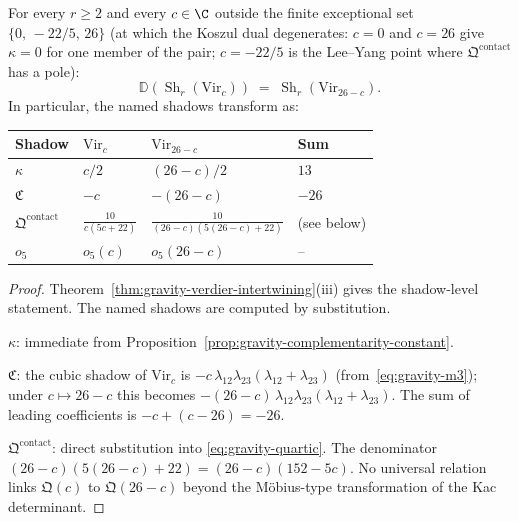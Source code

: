 \begin{theorem}
\label{thm:gravity-shadow-duality}
For every $r \ge 2$ and every $c \in \C$ outside the
finite exceptional set $\{0,\, -22/5,\, 26\}$
\textup{(}at which the Koszul dual degenerates: $c = 0$ and
$c = 26$ give $\kappa = 0$ for one member of the pair;
$c = -22/5$ is the Lee--Yang point where
$\mathfrak{Q}^{\mathrm{contact}}$ has a pole\textup{)}:
\begin{equation}\label{eq:shadow-duality}
\mathbb{D}\!\left(\operatorname{Sh}_r(\mathrm{Vir}_c)\right)
\;=\;
\operatorname{Sh}_r(\mathrm{Vir}_{26-c}).
\end{equation}
In particular, the named shadows transform as:
\begin{center}
\small
\renewcommand{\arraystretch}{1.15}
\begin{tabular}{llll}
\textbf{Shadow} & $\mathrm{Vir}_c$ & $\mathrm{Vir}_{26-c}$
 & \textbf{Sum} \\
\hline
$\kappa$ & $c/2$ & $(26-c)/2$ & $13$ \\[2pt]
$\mathfrak{C}$ & $-c$ & $-(26-c)$ & $-26$ \\[2pt]
$\mathfrak{Q}^{\mathrm{contact}}$
 & $\frac{10}{c(5c+22)}$
 & $\frac{10}{(26-c)(5(26-c)+22)}$
 & \textup{(see below)} \\[2pt]
$o_5$ & $o_5(c)$ & $o_5(26-c)$ & --
\end{tabular}
\end{center}
\end{theorem}

\begin{proof}
Theorem~\ref{thm:gravity-verdier-intertwining}(iii) gives the
shadow-level statement. The named shadows are computed by
substitution.

$\kappa$: immediate from
Proposition~\ref{prop:gravity-complementarity-constant}.

$\mathfrak{C}$: the cubic shadow of $\mathrm{Vir}_c$ is
$-c\,\lambda_{12}\lambda_{23}(\lambda_{12}+\lambda_{23})$
(from~\eqref{eq:gravity-m3}); under $c \mapsto 26-c$ this
becomes $-(26-c)\,\lambda_{12}\lambda_{23}(\lambda_{12}+\lambda_{23})$.
The sum of leading coefficients is $-c + (c-26) = -26$.

$\mathfrak{Q}^{\mathrm{contact}}$: direct substitution into
\eqref{eq:gravity-quartic}. The denominator
$(26-c)(5(26-c)+22) = (26-c)(152 - 5c)$. No universal
relation links $\mathfrak{Q}(c)$ to $\mathfrak{Q}(26-c)$
beyond the M\"obius-type transformation of the Kac determinant.
\end{proof}

